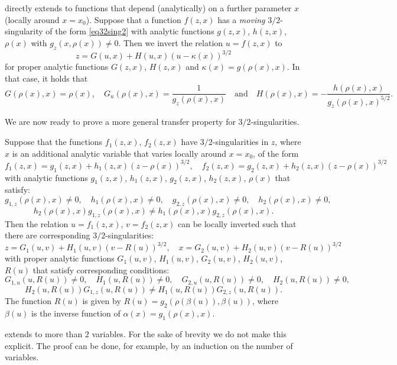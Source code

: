 \documentclass[a4paper,UKenglish,cleveref, autoref, thm-restate]{lipics-v2021}
\renewcommand{\(}{\left(}
\renewcommand{\)}{\right)}
\begin{document}
\begin{remark} \label{rem:LeSing1-param-x} directly extends to functions
that depend (analytically) on a further parameter $x$ (locally around $x=x_0$). 
Suppose that a function $f(z,x)$ has a \emph{moving} $3/2$-singularity of the form \cref{eq32sing2}
with analytic functions $g(z,x)$, $h(z,x)$, $\rho(x)$ with $g_z(x,\rho(x)) \ne 0$.
Then we invert the relation $u = f(z,x)$ to 
\[
z = G(u,x) + H(u,x) (u-\kappa(x))^{3/2}
\]
for proper analytic functions $G(z,x)$, $H(z,x)$ and  $\kappa(x) = g(\rho(x),x)$. In that case, it holds that
\[G(\rho(x),x) = \rho(x),\quad G_u(\rho(x),x) = \frac{1}{g_z(\rho(x),x)}\quad\text{and}\quad H(\rho(x),x) = -\frac{h(\rho(x),x)}{g_z(\rho(x),x)^{5/2}}.\]
\end{remark}

We are now ready to prove a more general transfer property for
$3/2$-singularities.
\begin{theorem}\label{LeSing2}
Suppose that the functions $f_1(z,x)$, $f_2(z,x)$ have $3/2$-singularities
in $z$, where $x$ is an additional analytic variable that varies locally
around $x= x_0$, of the form
\[
      f_1(z,x) = g_1(z,x) + h_1(z,x) (z-\rho(x))^{3/2}, \quad
      f_2(z,x) = g_2(z,x) + h_2(z,x) (z-\rho(x))^{3/2}
\]
with analytic functions $g_1(z,x)$, $h_1(z,x)$, $g_2(z,x)$, $h_2(z,x)$, $\rho(x)$
that satisfy:%
\[
g_{1,z}(\rho(x),x) \ne 0, \quad h_1(\rho(x),x)\ne 0, \quad
g_{2,z}(\rho(x),x) \ne 0, \quad h_2(\rho(x),x)\ne 0, 
\]
\[
h_2(\rho(x),x)g_{1,z}(\rho(x),x) \ne h_1(\rho(x),x)g_{2,z}(\rho(x),x).
\]
Then the relation $u = f_1(z,x)$, $v = f_2(z,x)$ can be locally inverted 
such that there are corresponding $3/2$-singularities:
\[
      z = G_1(u,v) + H_1(u,v) (v-R(u))^{3/2}, \quad
      x = G_2(u,v) + H_2(u,v) (v-R(u))^{3/2}
\]
with proper analytic functions $G_1(u,v)$, $H_1(u,v) $,  $G_2(u,v)$, $H_2(u,v)$,
$R(u)$ that satisfy corresponding conditions:
\[
G_{1,u}(u,R(u)) \ne 0, \quad H_1(u,R(u))\ne 0, \quad
G_{2,u}(u,R(u)) \ne 0, \quad H_2(u,R(u))\ne 0, 
\]
\[
H_2(u,R(u))G_{1,z}(u,R(u)) \ne H_1(u,R(u))G_{2,z}(u,R(u)).
\]
The function $R(u)$ is given by
$R(u) = g_2(\rho(\beta(u)),\beta(u))$, where $\beta(u)$ is the inverse 
function of $\alpha(x) = g_1(\rho(x),x)$.
\end{theorem}

\begin{remark}\label{rem:LeSing2-more-variables}
 extends to more than $2$ variables. For the sake of brevity we
do not make this explicit. The proof can be done, for example, by an induction
on the number of variables.
\end{remark}
\end{document}
